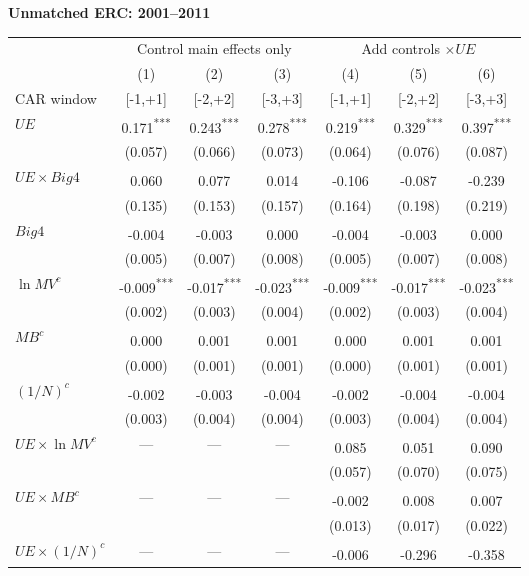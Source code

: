 \documentclass[10pt]{article}
\newcommand{\sym}[1]{\textsuperscript{#1}}
\begin{document}
\noindent\textbf{Unmatched ERC: 2001--2011}\par\medskip
\setlength{\tabcolsep}{4pt}\renewcommand{\arraystretch}{1.12}
\noindent\begin{tabular*}{\textwidth}{@{\extracolsep{\fill}}lcccccc@{}}\toprule
 & \multicolumn{3}{c}{Control main effects only} & \multicolumn{3}{c}{Add controls \(\times UE\)} \\
\cmidrule(lr){2-4}\cmidrule(lr){5-7}
 & (1) & (2) & (3) & (4) & (5) & (6) \\
CAR window & [-1,+1] & [-2,+2] & [-3,+3] & [-1,+1] & [-2,+2] & [-3,+3] \\\midrule
\(UE\) & 0.171\sym{***} & 0.243\sym{***} & 0.278\sym{***} & 0.219\sym{***} & 0.329\sym{***} & 0.397\sym{***} \\
 & (0.057) & (0.066) & (0.073) & (0.064) & (0.076) & (0.087) \\
\(UE\times Big4\) & 0.060\sym{} & 0.077\sym{} & 0.014\sym{} & -0.106\sym{} & -0.087\sym{} & -0.239\sym{} \\
 & (0.135) & (0.153) & (0.157) & (0.164) & (0.198) & (0.219) \\
\(Big4\) & -0.004\sym{} & -0.003\sym{} & 0.000\sym{} & -0.004\sym{} & -0.003\sym{} & 0.000\sym{} \\
 & (0.005) & (0.007) & (0.008) & (0.005) & (0.007) & (0.008) \\
\(\ln MV^c\) & -0.009\sym{***} & -0.017\sym{***} & -0.023\sym{***} & -0.009\sym{***} & -0.017\sym{***} & -0.023\sym{***} \\
 & (0.002) & (0.003) & (0.004) & (0.002) & (0.003) & (0.004) \\
\(MB^c\) & 0.000\sym{} & 0.001\sym{} & 0.001\sym{} & 0.000\sym{} & 0.001\sym{} & 0.001\sym{} \\
 & (0.000) & (0.001) & (0.001) & (0.000) & (0.001) & (0.001) \\
\((1/N)^c\) & -0.002\sym{} & -0.003\sym{} & -0.004\sym{} & -0.002\sym{} & -0.004\sym{} & -0.004\sym{} \\
 & (0.003) & (0.004) & (0.004) & (0.003) & (0.004) & (0.004) \\
\(UE\times\ln MV^c\) & --- & --- & --- & 0.085\sym{} & 0.051\sym{} & 0.090\sym{} \\
 &  &  &  & (0.057) & (0.070) & (0.075) \\
\(UE\times MB^c\) & --- & --- & --- & -0.002\sym{} & 0.008\sym{} & 0.007\sym{} \\
 &  &  &  & (0.013) & (0.017) & (0.022) \\
\(UE\times(1/N)^c\) & --- & --- & --- & -0.006\sym{} & -0.296\sym{} & -0.358\sym{} \\

\end{tabular*}
\end{document}
